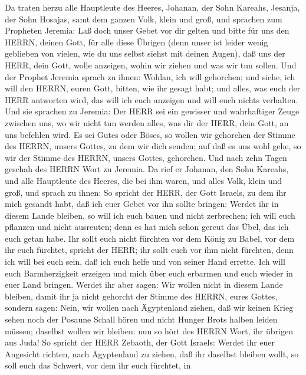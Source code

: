  Da traten herzu alle Hauptleute des Heeres, Johanan, der
Sohn Kareahs, Jesanja, der Sohn Hosajas, samt dem ganzen Volk, klein und
groß,  und sprachen zum Propheten Jeremia: Laß doch unser
Gebet vor dir gelten und bitte für uns den HERRN, deinen Gott, für alle
diese Übrigen (denn unser ist leider wenig geblieben von vielen, wie du
uns selbst siehst mit deinen Augen),  daß uns der HERR, dein
Gott, wolle anzeigen, wohin wir ziehen und was wir tun sollen.
 Und der Prophet Jeremia sprach zu ihnen: Wohlan, ich will
gehorchen; und siehe, ich will den HERRN, euren Gott, bitten, wie ihr
gesagt habt; und alles, was euch der HERR antworten wird, das will ich
euch anzeigen und will euch nichts verhalten.  Und sie
sprachen zu Jeremia: Der HERR sei ein gewisser und wahrhaftiger Zeuge
zwischen uns, wo wir nicht tun werden alles, was dir der HERR, dein
Gott, an uns befehlen wird.  Es sei Gutes oder Böses, so
wollen wir gehorchen der Stimme des HERRN, unsers Gottes, zu dem wir
dich senden; auf daß es uns wohl gehe, so wir der Stimme des HERRN,
unsers Gottes, gehorchen.  Und nach zehn Tagen geschah des
HERRN Wort zu Jeremia.  Da rief er Johanan, den Sohn
Kareahs, und alle Hauptleute des Heeres, die bei ihm waren, und alles
Volk, klein und groß,  und sprach zu ihnen: So spricht der
HERR, der Gott Israels, zu dem ihr mich gesandt habt, daß ich euer Gebet
vor ihn sollte bringen:  Werdet ihr in diesem Lande
bleiben, so will ich euch bauen und nicht zerbrechen; ich will euch
pflanzen und nicht ausreuten; denn es hat mich schon gereut das Übel,
das ich euch getan habe.  Ihr sollt euch nicht fürchten vor
dem König zu Babel, vor dem ihr euch fürchtet, spricht der HERR; ihr
sollt euch vor ihm nicht fürchten, denn ich will bei euch sein, daß ich
euch helfe und von seiner Hand errette.  Ich will euch
Barmherzigkeit erzeigen und mich über euch erbarmen und euch wieder in
euer Land bringen.  Werdet ihr aber sagen: Wir wollen nicht
in diesem Lande bleiben, damit ihr ja nicht gehorcht der Stimme des
HERRN, eures Gottes,  sondern sagen: Nein, wir wollen nach
Ägyptenland ziehen, daß wir keinen Krieg sehen noch der Posaune Schall
hören und nicht Hunger Brots halben leiden müssen; daselbst wollen wir
bleiben:  nun so hört des HERRN Wort, ihr übrigen aus Juda!
So spricht der HERR Zebaoth, der Gott Israels: Werdet ihr euer Angesicht
richten, nach Ägyptenland zu ziehen, daß ihr daselbst bleiben wollt,
 so soll euch das Schwert, vor dem ihr euch fürchtet, in
